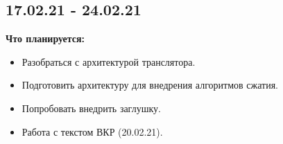 \documentclass[a4peper, 12pt, titlepage, finall]{extreport}
\begin{document}
        \subsection{17.02.21 - 24.02.21}
            {\bf Что планируется:}
            \begin{itemize}
                \item Разобраться с архитектурой транслятора.
                \item Подготовить архитектуру для внедрения алгоритмов сжатия.
                \item Попробовать внедрить заглушку.
                \item Работа с текстом ВКР (20.02.21).
            \end{itemize}
\end{document}
